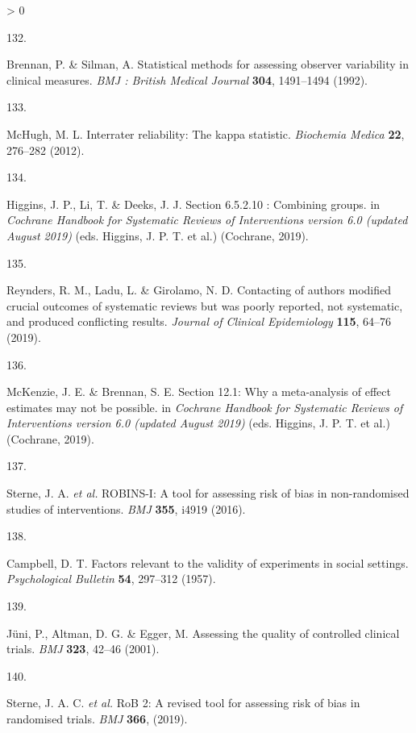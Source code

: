 \documentclass[a4paper, twoside]{templates/ociamthesis}
\newlength{\cslhangindent}
\newlength{\csllabelwidth}
\newenvironment{CSLReferences}[3] %
 {%
  \setlength{\parindent}{0pt}
  \ifodd #1 \everypar{\setlength{\hangindent}{\cslhangindent}}\ignorespaces\fi
  \ifnum #2 > 0
  \setlength{\parskip}{#2\baselineskip}
  \fi
 }%
 {}
\newcommand{\CSLLeftMargin}[1]{\parbox[t]{\maxof{\widthof{#1}}{\csllabelwidth}}{#1}}
\newcommand{\CSLRightInline}[1]{\parbox[t]{\linewidth - \csllabelwidth}{#1}}
\begin{document}
\begin{CSLReferences}{0}{0}
\leavevmode\hypertarget{ref-brennan1992}{}%
\CSLLeftMargin{132. }
\CSLRightInline{Brennan, P. \& Silman, A. Statistical methods for assessing observer variability in clinical measures. \emph{BMJ : British Medical Journal} \textbf{304}, 1491--1494 (1992).}

\leavevmode\hypertarget{ref-mchugh2012}{}%
\CSLLeftMargin{133. }
\CSLRightInline{McHugh, M. L. Interrater reliability: The kappa statistic. \emph{Biochemia Medica} \textbf{22}, 276--282 (2012).}

\leavevmode\hypertarget{ref-higgins2019}{}%
\CSLLeftMargin{134. }
\CSLRightInline{Higgins, J. P., Li, T. \& Deeks, J. J. Section 6.5.2.10 : {Combining} groups. in \emph{Cochrane {Handbook} for {Systematic Reviews} of {Interventions} version 6.0 (updated {August} 2019)} (eds. Higgins, J. P. T. et al.) ({Cochrane}, 2019).}

\leavevmode\hypertarget{ref-reynders2019}{}%
\CSLLeftMargin{135. }
\CSLRightInline{Reynders, R. M., Ladu, L. \& Girolamo, N. D. Contacting of authors modified crucial outcomes of systematic reviews but was poorly reported, not systematic, and produced conflicting results. \emph{Journal of Clinical Epidemiology} \textbf{115}, 64--76 (2019).}

\leavevmode\hypertarget{ref-mckenzie2019}{}%
\CSLLeftMargin{136. }
\CSLRightInline{McKenzie, J. E. \& Brennan, S. E. Section 12.1: {Why} a meta-analysis of effect estimates may not be possible. in \emph{Cochrane {Handbook} for {Systematic Reviews} of {Interventions} version 6.0 (updated {August} 2019)} (eds. Higgins, J. P. T. et al.) ({Cochrane}, 2019).}

\leavevmode\hypertarget{ref-sterne2016}{}%
\CSLLeftMargin{137. }
\CSLRightInline{Sterne, J. A. \emph{et al.} {ROBINS}-{I}: A tool for assessing risk of bias in non-randomised studies of interventions. \emph{BMJ} \textbf{355}, i4919 (2016).}

\leavevmode\hypertarget{ref-campbell1957}{}%
\CSLLeftMargin{138. }
\CSLRightInline{Campbell, D. T. Factors relevant to the validity of experiments in social settings. \emph{Psychological Bulletin} \textbf{54}, 297--312 (1957).}

\leavevmode\hypertarget{ref-juni2001}{}%
\CSLLeftMargin{139. }
\CSLRightInline{Jüni, P., Altman, D. G. \& Egger, M. Assessing the quality of controlled clinical trials. \emph{BMJ} \textbf{323}, 42--46 (2001).}

\leavevmode\hypertarget{ref-sterne2019}{}%
\CSLLeftMargin{140. }
\CSLRightInline{Sterne, J. A. C. \emph{et al.} {RoB} 2: A revised tool for assessing risk of bias in randomised trials. \emph{BMJ} \textbf{366}, (2019).}


\end{CSLReferences}
\end{document}
